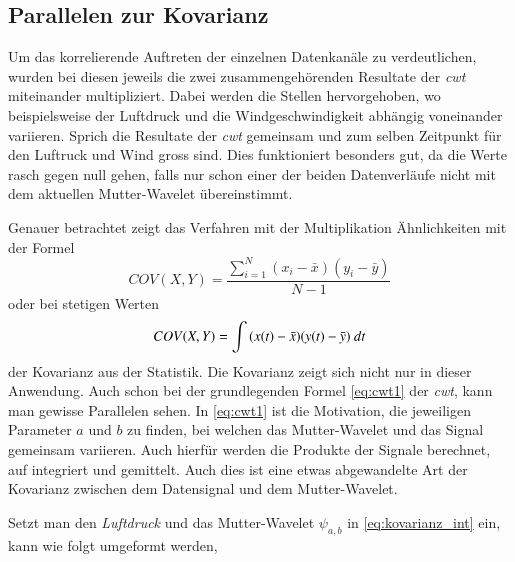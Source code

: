 \begin{refsection}
\subsection{Parallelen zur Kovarianz}
Um das korrelierende Auftreten der einzelnen Datenkanäle zu verdeutlichen, wurden bei diesen jeweils die zwei zusammengehörenden Resultate der \textit{cwt} miteinander multipliziert. 
Dabei werden die Stellen hervorgehoben, wo beispielsweise der Luftdruck und die Windgeschwindigkeit abhängig voneinander variieren. 
Sprich die Resultate der \textit{cwt} gemeinsam und zum selben Zeitpunkt für den Luftruck und Wind gross sind.
Dies funktioniert besonders gut, da die Werte rasch gegen null gehen, falls nur schon einer der beiden Datenverläufe nicht mit dem aktuellen Mutter-Wavelet übereinstimmt.


Genauer betrachtet zeigt das Verfahren mit der Multiplikation Ähnlichkeiten mit der Formel
\begin{equation}
COV(X,Y) = \frac{\sum_{i=1}^{N} (x_i- \bar{x})(y_i- \bar{y})}{N-1}
\label{eq:kovarianz}
\end{equation}
oder bei stetigen Werten
\begin{equation}
COV(X,Y) = \int{(x(t)- \bar{x})(y(t)- \bar{y}) \text{\space}dt}
\label{eq:kovarianz_int}
\end{equation}
der Kovarianz aus der Statistik. 
Die Kovarianz zeigt sich nicht nur in dieser Anwendung. Auch schon bei der grundlegenden Formel \eqref{eq:cwt1} der \textit{cwt}, kann man gewisse Parallelen sehen. 
In \eqref{eq:cwt1} ist die Motivation, die jeweiligen Parameter $a$ und $b$ zu finden, bei welchen das Mutter-Wavelet und das Signal gemeinsam variieren.
Auch hierfür werden die Produkte der Signale berechnet, auf integriert und gemittelt.
Auch dies ist eine etwas abgewandelte Art der Kovarianz zwischen dem Datensignal und dem Mutter-Wavelet.

Setzt man den \textit{Luftdruck} und das Mutter-Wavelet $\psi_{a,b}$ in \eqref{eq:kovarianz_int} ein, kann wie folgt umgeformt werden,


\end{refsection}

